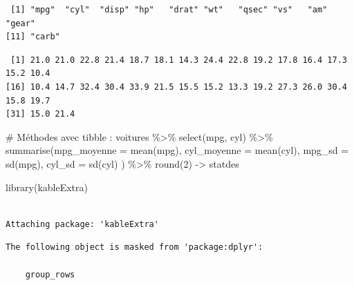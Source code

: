 \documentclass[
  french,
  letterpaper,
  DIV=11,
  numbers=noendperiod]{scrartcl}
\newenvironment{Shaded}{\begin{snugshade}}{\end{snugshade}}
\newcommand{\AttributeTok}[1]{\textcolor[rgb]{0.40,0.45,0.13}{#1}}
\newcommand{\CommentTok}[1]{\textcolor[rgb]{0.37,0.37,0.37}{#1}}
\newcommand{\DecValTok}[1]{\textcolor[rgb]{0.68,0.00,0.00}{#1}}
\newcommand{\FunctionTok}[1]{\textcolor[rgb]{0.28,0.35,0.67}{#1}}
\newcommand{\NormalTok}[1]{\textcolor[rgb]{0.00,0.23,0.31}{#1}}
\newcommand{\OtherTok}[1]{\textcolor[rgb]{0.00,0.23,0.31}{#1}}
\newcommand{\SpecialCharTok}[1]{\textcolor[rgb]{0.37,0.37,0.37}{#1}}
\begin{document}
\begin{verbatim}
 [1] "mpg"  "cyl"  "disp" "hp"   "drat" "wt"   "qsec" "vs"   "am"   "gear"
[11] "carb"
\end{verbatim}

\begin{Shaded}
\end{Shaded}

\begin{verbatim}
 [1] 21.0 21.0 22.8 21.4 18.7 18.1 14.3 24.4 22.8 19.2 17.8 16.4 17.3 15.2 10.4
[16] 10.4 14.7 32.4 30.4 33.9 21.5 15.5 15.2 13.3 19.2 27.3 26.0 30.4 15.8 19.7
[31] 15.0 21.4
\end{verbatim}

\begin{Shaded}
\begin{Highlighting}[]
\CommentTok{\# Méthodes avec tibble :}
\NormalTok{voitures }\SpecialCharTok{\%\textgreater{}\%} \FunctionTok{select}\NormalTok{(mpg, cyl) }\SpecialCharTok{\%\textgreater{}\%} \FunctionTok{summarise}\NormalTok{(}\AttributeTok{mpg\_moyenne =} \FunctionTok{mean}\NormalTok{(mpg),}
                                            \AttributeTok{cyl\_moyenne =} \FunctionTok{mean}\NormalTok{(cyl),}
                                            \AttributeTok{mpg\_sd =} \FunctionTok{sd}\NormalTok{(mpg),}
                                            \AttributeTok{cyl\_sd =} \FunctionTok{sd}\NormalTok{(cyl)}
\NormalTok{                                            ) }\SpecialCharTok{\%\textgreater{}\%} \FunctionTok{round}\NormalTok{(}\DecValTok{2}\NormalTok{) }\OtherTok{{-}\textgreater{}}\NormalTok{ statdes}
\end{Highlighting}
\end{Shaded}

\begin{Shaded}
\begin{Highlighting}[]
\FunctionTok{library}\NormalTok{(kableExtra)}
\end{Highlighting}
\end{Shaded}

\begin{verbatim}

Attaching package: 'kableExtra'
\end{verbatim}

\begin{verbatim}
The following object is masked from 'package:dplyr':

    group_rows
\end{verbatim}
\end{document}
